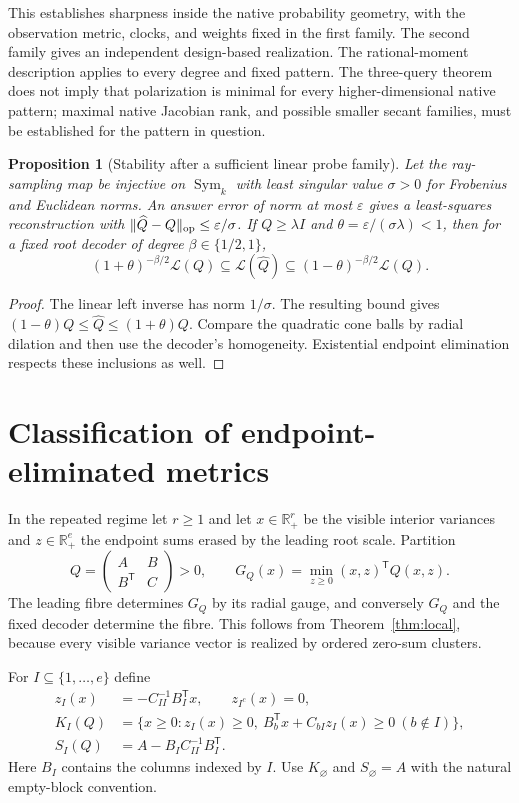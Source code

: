 \documentclass[11pt,reqno]{amsart}
\numberwithin{equation}{section}
\newtheorem{proposition}[theorem]{Proposition}
\theoremstyle{definition}
\theoremstyle{remark}
\newcommand{\R}{\mathbb R}
\newcommand{\Sym}{\operatorname{Sym}}
\newcommand{\cL}{\mathcal L}
\newcommand{\eps}{\varepsilon}
\begin{document}
This establishes sharpness inside the native probability geometry, with the observation metric, clocks, and weights fixed in the first family. The second family gives an independent design-based realization. The rational-moment description applies to every degree and fixed pattern. The three-query theorem does not imply that polarization is minimal for every higher-dimensional native pattern; maximal native Jacobian rank, and possible smaller secant families, must be established for the pattern in question.

\begin{proposition}[Stability after a sufficient linear probe family]\label{prop:probe-stability}
Let the ray-sampling map be injective on $\Sym_k$ with least singular value $\sigma>0$ for Frobenius and Euclidean norms. An answer error of norm at most $\eps$ gives a least-squares reconstruction with $\|\widehat Q-Q\|_{\rm op}\le\eps/\sigma$. If $Q\ge\lambda I$ and $\theta=\eps/(\sigma\lambda)<1$, then for a fixed root decoder of degree $\beta\in\{1/2,1\}$,
\[
 (1+\theta)^{-\beta/2}\cL(Q)\subseteq\cL(\widehat Q)
 \subseteq(1-\theta)^{-\beta/2}\cL(Q).
\]
\end{proposition}
\begin{proof}
The linear left inverse has norm $1/\sigma$. The resulting bound gives
$(1-\theta)Q\le\widehat Q\le(1+\theta)Q$. Compare the quadratic cone balls by radial dilation and then use the decoder's homogeneity. Existential endpoint elimination respects these inclusions as well.
\end{proof}

\section{Classification of endpoint-eliminated metrics}\label{sec:endpoints}
In the repeated regime let $r\ge1$ and let $x\in\R_+^r$ be the visible interior variances and $z\in\R_+^e$ the endpoint sums erased by the leading root scale. Partition
\[
 Q=\begin{pmatrix}A&B\\B^{\mathsf T}&C\end{pmatrix}>0,
 \qquad G_Q(x)=\min_{z\ge0}(x,z)^{\mathsf T}Q(x,z).
\]
The leading fibre determines $G_Q$ by its radial gauge, and conversely $G_Q$ and the fixed decoder determine the fibre. This follows from Theorem~\ref{thm:local}, because every visible variance vector is realized by ordered zero-sum clusters.

For $I\subseteq\{1,\ldots,e\}$ define
\begin{align*}
 z_I(x)&=-C_{II}^{-1}B_I^{\mathsf T}x,\qquad z_{I^c}(x)=0,\\
 K_I(Q)&=\{x\ge0:z_I(x)\ge0,\ B_b^{\mathsf T}x+C_{bI}z_I(x)\ge0\ (b\notin I)\},\\
 S_I(Q)&=A-B_IC_{II}^{-1}B_I^{\mathsf T}.
\end{align*}
Here $B_I$ contains the columns indexed by $I$. Use $K_\varnothing$ and $S_\varnothing=A$ with the natural empty-block convention.
\end{document}
